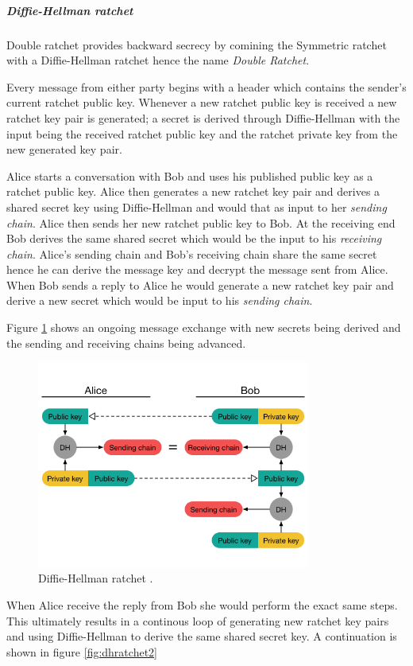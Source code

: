 \newpage
\subparagraph{Diffie-Hellman ratchet}

Double ratchet provides backward secrecy by comining the Symmetric ratchet with a Diffie-Hellman ratchet hence the name \emph{Double Ratchet}.

Every message from either party begins with a header which contains the sender's current ratchet public key. Whenever a new ratchet public key is received a new ratchet key pair is generated; a secret is derived through Diffie-Hellman with the input being the received ratchet public key and the ratchet private key from the new generated key pair.

Alice starts a conversation with Bob and uses his published public key as a ratchet public key. Alice then generates a new ratchet key pair and derives a shared secret key using Diffie-Hellman and would that as input to her \emph{sending chain}. Alice then sends her new ratchet public key to Bob. At the receiving end Bob derives the same shared secret which would be the input to his \emph{receiving chain}. Alice's sending chain and Bob's receiving chain share the same secret hence he can derive the message key and decrypt the message sent from Alice. When Bob sends a reply to Alice he would generate a new ratchet key pair and derive a new secret which would be input to his \emph{sending chain}.

Figure \ref{fig:dhratchet1} shows an ongoing message exchange with new secrets being derived and the sending and receiving chains being advanced.

\begin{figure}[H]
	\centering
	\includegraphics[width=9cm]{figures/dhratchet5.png}
	\caption{Diffie-Hellman ratchet \cite{doubleratchet}.}
	\label{fig:dhratchet1}
\end{figure}


When Alice receive the reply from Bob she would perform the exact same steps. This ultimately results in a continous loop of generating new ratchet key pairs and using Diffie-Hellman to derive the same shared secret key. A continuation is shown in figure \ref{fig:dhratchet2}

